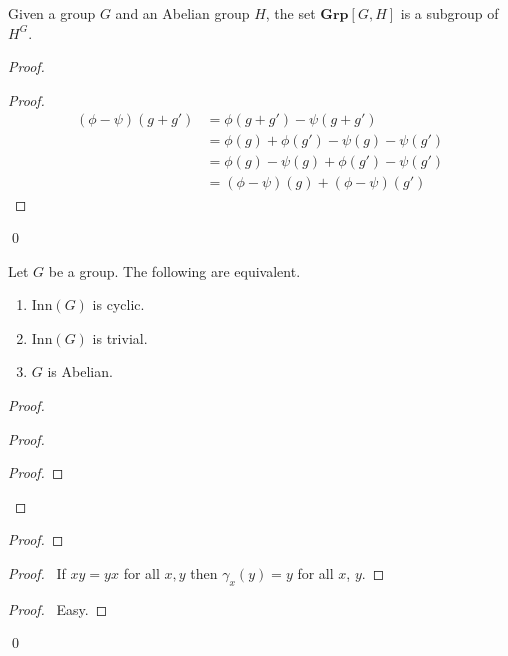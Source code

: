 \begin{prop}
    Given a group $G$ and an Abelian group $H$, the set $\mathbf{Grp}[G,H]$ is a subgroup of $H^G$.
\end{prop}

\begin{proof}
    \pf
    \begin{proof}
        \pf
        \begin{align*}
            (\phi - \psi)(g + g') & = \phi(g + g') - \psi(g + g')             \\
                                  & = \phi(g) + \phi(g') - \psi(g) - \psi(g') \\
                                  & = \phi(g) - \psi(g) + \phi(g') - \psi(g') \\
                                  & = (\phi - \psi)(g) + (\phi - \psi)(g')
        \end{align*}
    \end{proof}
    \qed
\end{proof}

\begin{prop}
Let $G$ be a group. The following are equivalent.
\begin{enumerate}
\item $\mathrm{Inn}(G)$ is cyclic.
\item $\mathrm{Inn}(G)$ is trivial.
\item $G$ is Abelian.
\end{enumerate}
\end{prop}

\begin{proof}
\pf
{}
\begin{proof}
	\begin{proof}
	\end{proof}
\end{proof}
\begin{proof}
\end{proof}
\begin{proof}
	\pf\ If $xy = yx$ for all $x,y$ then $\gamma_x(y) = y$ for all $x$, $y$.
\end{proof}
\begin{proof}
	\pf\ Easy.
\end{proof}
\qed
\end{proof}

